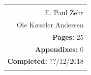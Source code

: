 \begin{titlepage}
{\begin{tabular}{r}
{	
	\textbf{Supervisors:}\\
	E. Paul Zehr \\
	Ole Kæseler Andersen\\
	
	\textbf{Pages:} 25\\
	\textbf{Appendixes:} 0 \\
	\textbf{Completed:} ??/12/2018\\
}
	
		\hfill \hspace{0.5cm} \parbox{10cm}{\begin{tabular}{l} %
				\fbox{
					\parbox{9.3cm}{\bigskip
						{\vfill{\small 
								\bigskip}}
				}}
	\end{tabular}}
\end{tabular}}


\end{titlepage}
%